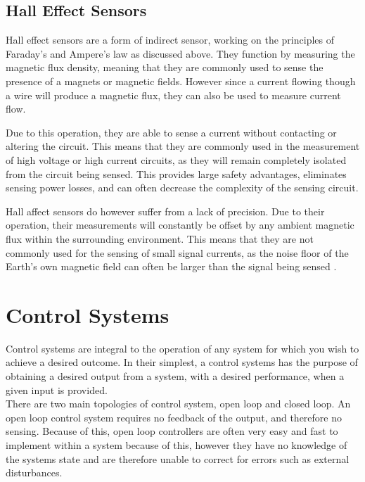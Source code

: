 \subsection{Hall Effect Sensors}\label{S:hall_effect_back}

Hall effect sensors are a form of indirect sensor, working on the principles of Faraday’s and Ampere’s law as discussed above. They function by measuring the magnetic flux density, meaning that they are commonly used to sense the presence of a magnets or magnetic fields. However since a current flowing though a wire will produce a magnetic flux, they can also be used to measure current flow.

Due to this operation, they are able to sense a current without contacting or altering the circuit. This means that they are commonly used in the measurement of high voltage or high current circuits, as they will remain completely isolated from the circuit being sensed. This provides large safety advantages, eliminates sensing power losses, and can often decrease the complexity of the sensing circuit. 

Hall affect sensors do however suffer from a lack of precision. Due to their operation, their measurements will constantly be offset by any ambient magnetic flux within the surrounding environment. This means that they are not commonly used for the sensing of small signal currents, as the noise floor of the Earth's own magnetic field can often be larger than the signal being sensed \cite{hall_effect_precision}. 

\newpage

\section{Control Systems}\label{S:control_back}

Control systems are integral to the operation of any system for which you wish to achieve a desired outcome. In their simplest, a control systems has the purpose of obtaining a desired output from a system, with a desired performance, when a given input is provided. \\

There are two main topologies of control system, open loop and closed loop. An open loop control system requires no feedback of the output, and therefore no sensing. Because of this, open loop controllers are often very easy and fast to implement within a system because of this, however they have no knowledge of the systems state and are therefore unable to correct for errors such as external disturbances. 

